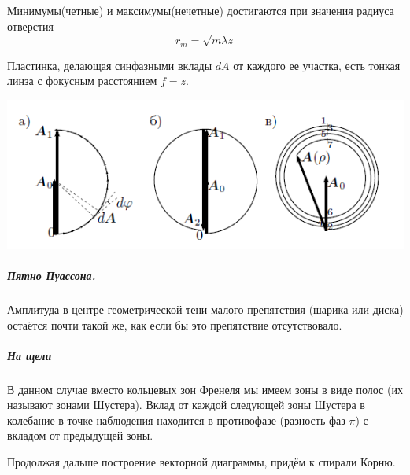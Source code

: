 \documentclass[12pt]{article}
\begin{document}
	Минимумы(четные) и максимумы(нечетные) достигаются при значения радиуса отверстия
	$$\boxed{r_m = \sqrt{m\lambda z}}$$
	
	 Пластинка, делающая синфазными вклады $dA$ от каждого ее участка, есть тонкая линза с фокусным расстоянием $f = z$.
	 
	\begin{center} \includegraphics{amp_method}
	\end{center}
 
	 \subparagraph{Пятно Пуассона.}
	 Амплитуда в центре геометрической тени малого препятствия (шарика или диска) остаётся почти такой же, как если бы это препятствие отсутствовало.
	
	\subparagraph{На щели}
	
	В данном случае вместо кольцевых зон Френеля мы имеем зоны в виде полос (их называют
	зонами Шустера). Вклад от каждой следующей
	зоны Шустера в колебание в точке наблюдения находится в противофазе (разность фаз $\pi$)
	с вкладом от предыдущей зоны.
	
	
	Продолжая дальше построение векторной
	диаграммы, придём к спирали Корню.
	
\end{document}
